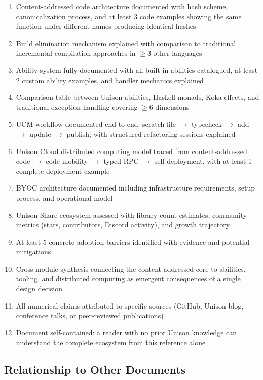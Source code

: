 \documentclass[11pt,letterpaper]{article}
\begin{document}
\begin{enumerate}[label=\textbf{\arabic*.}]
  \item Content-addressed code architecture documented with hash scheme, canonicalization process, and at least 3 code examples showing the same function under different names producing identical hashes
  \item Build elimination mechanism explained with comparison to traditional incremental compilation approaches in $\geq$3 other languages
  \item Ability system fully documented with all built-in abilities catalogued, at least 2 custom ability examples, and handler mechanics explained
  \item Comparison table between Unison abilities, Haskell monads, Koka effects, and traditional exception handling covering $\geq$6 dimensions
  \item UCM workflow documented end-to-end: scratch file $\rightarrow$ typecheck $\rightarrow$ add $\rightarrow$ update $\rightarrow$ publish, with structured refactoring sessions explained
  \item Unison Cloud distributed computing model traced from content-addressed code $\rightarrow$ code mobility $\rightarrow$ typed RPC $\rightarrow$ self-deployment, with at least 1 complete deployment example
  \item BYOC architecture documented including infrastructure requirements, setup process, and operational model
  \item Unison Share ecosystem assessed with library count estimates, community metrics (stars, contributors, Discord activity), and growth trajectory
  \item At least 5 concrete adoption barriers identified with evidence and potential mitigations
  \item Cross-module synthesis connecting the content-addressed core to abilities, tooling, and distributed computing as emergent consequences of a single design decision
  \item All numerical claims attributed to specific sources (GitHub, Unison blog, conference talks, or peer-reviewed publications)
  \item Document self-contained: a reader with no prior Unison knowledge can understand the complete ecosystem from this reference alone
\end{enumerate}

\subsection{Relationship to Other Documents}
\end{document}
